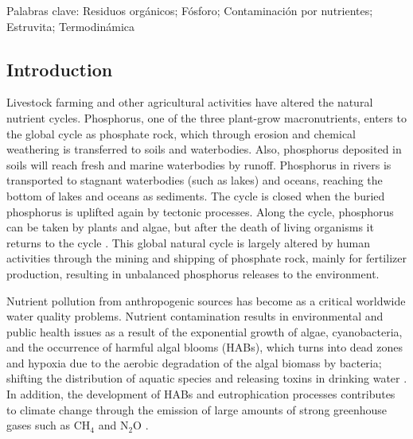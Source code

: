 \medskip
Palabras clave: Residuos orgánicos; Fósforo; Contaminación por nutrientes; Estruvita; Termodinámica

\newpage

\begin{refsection}[referencesCh3]
\section{Introduction}
Livestock farming and other agricultural activities have altered the natural nutrient cycles. Phosphorus, one of the three plant-grow macronutrients, enters to the global cycle as phosphate rock, which through erosion and chemical weathering is transferred to soils and waterbodies. Also, phosphorus deposited in soils will reach fresh and marine waterbodies by runoff. Phosphorus in rivers is transported to stagnant waterbodies (such as lakes) and oceans, reaching the bottom of lakes and oceans as sediments. The cycle is closed when the buried phosphorus is uplifted again by tectonic processes. Along the cycle, phosphorus can be taken by plants and algae, but after the death of living organisms it returns to the cycle \citep{RUTTENBERG2001401}. This global natural cycle is largely altered by human activities through the mining and shipping of phosphate rock, mainly for fertilizer production, resulting in unbalanced phosphorus releases to the environment.

Nutrient pollution from anthropogenic sources has become as a critical worldwide water quality problems. Nutrient contamination results in environmental and public health issues as a result of the exponential growth of algae, cyanobacteria, and the occurrence of harmful algal blooms (HABs), which turns into dead zones and hypoxia due to the aerobic degradation of the algal biomass by bacteria; shifting the distribution of aquatic species and releasing toxins in drinking water \citep{Sampat2}. In addition, the development of HABs and eutrophication processes contributes to climate change through the emission of large amounts of strong greenhouse gases such as $\text{CH}_{4}$ and $\text{N}_{2}\text{O}$ \citep{Beaulieu}.


\end{refsection}
